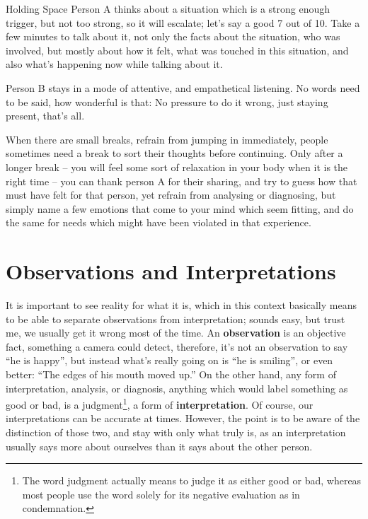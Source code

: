 \begin{exercise}{Holding Space}
    Person A thinks about a situation which is a strong enough trigger, but not too strong, so it will escalate; let's say a good 7 out of 10.
    Take a few minutes to talk about it, not only the facts about the situation, who was involved, but mostly about how it felt, what was touched in this situation, and also what's happening now while talking about it.

    Person B stays in a mode of attentive, and empathetical listening.
    No words need to be said, how wonderful is that: No pressure to do it wrong, just staying present, that's all.

    When there are small breaks, refrain from jumping in immediately, people sometimes need a break to sort their thoughts before continuing.
    Only after a longer break -- you will feel some sort of relaxation in your body when it is the right time -- you can thank person A for their sharing, and try to guess how that must have felt for that person, yet refrain from analysing or diagnosing, but simply name a few emotions that come to your mind which seem fitting, and do the same for needs which might have been violated in that experience.
\end{exercise}

\section{Observations and Interpretations}\label{sec:observations-and-interpretations}

It is important to see reality for what it is, which in this context basically means to be able to separate observations from interpretation; sounds easy, but trust me, we usually get it wrong most of the time.
An \textbf{observation} is an objective fact, something a camera could detect, therefore, it's not an observation to say ``he is happy'', but instead what's really going on is ``he is smiling'', or even better: ``The edges of his mouth moved up.''
On the other hand, any form of interpretation, analysis, or diagnosis, anything which would label something as good or bad, is a judgment\footnote{The word judgment actually means to judge it as either good or bad, whereas most people use the word solely for its negative evaluation as in condemnation.}, a form of \textbf{interpretation}.
Of course, our interpretations can be accurate at times.
However, the point is to be aware of the distinction of those two, and stay with only what truly is, as an interpretation usually says more about ourselves than it says about the other person.

